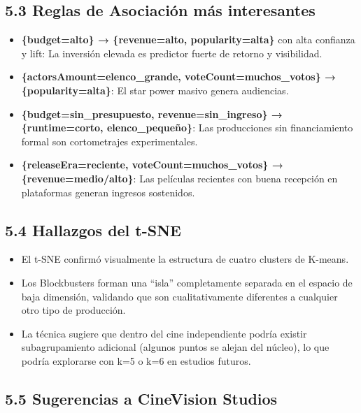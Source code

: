 \documentclass[
]{article}
\providecommand{\tightlist}{%
  \setlength{\itemsep}{0pt}\setlength{\parskip}{0pt}}
\begin{document}
\subsection{5.3 Reglas de Asociación más
interesantes}\label{reglas-de-asociaciuxf3n-muxe1s-interesantes}

\begin{itemize}
\tightlist
\item
  \textbf{\{budget=alto\} → \{revenue=alto, popularity=alta\}} con alta
  confianza y lift: La inversión elevada es predictor fuerte de retorno
  y visibilidad.\\
\item
  \textbf{\{actorsAmount=elenco\_grande, voteCount=muchos\_votos\} →
  \{popularity=alta\}}: El star power masivo genera audiencias.\\
\item
  \textbf{\{budget=sin\_presupuesto, revenue=sin\_ingreso\} →
  \{runtime=corto, elenco\_pequeño\}}: Las producciones sin
  financiamiento formal son cortometrajes experimentales.\\
\item
  \textbf{\{releaseEra=reciente, voteCount=muchos\_votos\} →
  \{revenue=medio/alto\}}: Las películas recientes con buena recepción
  en plataformas generan ingresos sostenidos.
\end{itemize}

\subsection{5.4 Hallazgos del t-SNE}\label{hallazgos-del-t-sne}

\begin{itemize}
\tightlist
\item
  El t-SNE confirmó visualmente la estructura de cuatro clusters de
  K-means.\\
\item
  Los Blockbusters forman una ``isla'' completamente separada en el
  espacio de baja dimensión, validando que son cualitativamente
  diferentes a cualquier otro tipo de producción.\\
\item
  La técnica sugiere que dentro del cine independiente podría existir
  subagrupamiento adicional (algunos puntos se alejan del núcleo), lo
  que podría explorarse con k=5 o k=6 en estudios futuros.
\end{itemize}

\subsection{5.5 Sugerencias a CineVision
Studios}\label{sugerencias-a-cinevision-studios}
\end{document}
